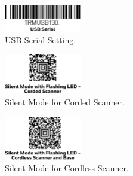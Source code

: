 \documentclass[11pt
  , a4paper
  , article
  , oneside
  , showtrims
]{memoir}
\begin{document}
\begin{figure}[!htb]
  \includegraphics[width=0.3\textwidth]{./pictures/scanner_settings_usbserial.eps}
  \caption{
            USB Serial Setting.
          }
  \label{fig:usb-serial}   
\end{figure}


\begin{figure}[!htb]
  \includegraphics[width=0.3\textwidth]{./pictures/scanner_settings_silent_corded.eps}
  \caption{
            Silent Mode for Corded Scanner.
          }
  \label{fig:silent-corded}   
\end{figure}



\begin{figure}[!htb]
  \includegraphics[width=0.3\textwidth]{./pictures/scanner_settings_silent_cordless.eps}
  \caption{
            Silent Mode for Cordless Scanner.
          }
  \label{fig:silent-cordless}   
\end{figure}


\end{document}
